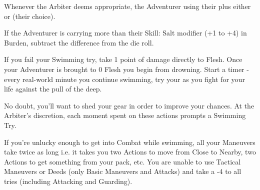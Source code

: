Whenever the Arbiter deems appropriate, the Adventurer \RO using their \MD plus either \VIG or \DEX (their choice). 

If the Adventurer is carrying more than their Skill: Salt modifier (+1 to +4) in Burden, subtract the difference from the die roll.


If you fail your Swimming try, take 1 point of damage directly to Flesh. Once your Adventurer is brought to 0 Flesh you begin  from drowning. Start a timer - every real-world minute you continue swimming, try your \DEATH as you fight for your life against the pull of the deep.


\newpage

No doubt, you'll want to shed your gear in order to improve your chances. At the Arbiter's discretion, each moment spent on these actions prompts a Swimming Try.


If you're unlucky enough to get into Combat while swimming, all your Maneuvers take twice as long i.e. it takes you two Actions to move from Close to Nearby, two Actions to get something from your pack, etc. You are unable to use Tactical Maneuvers or Deeds (only Basic Maneuvers and Attacks) and take a -4 to all \RO tries (including Attacking and Guarding). 


